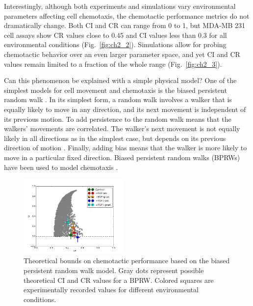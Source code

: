 Interestingly, although both experiments  and simulations vary environmental parameters affecting cell chemotaxis, the chemotactic performance metrics do not dramatically change. Both CI and CR can range from 0 to 1, but MDA-MB 231 cell assays show CR values close to 0.45 and CI values less than 0.3 for all environmental conditions (Fig.\ \ref{fig:ch2_2}). Simulations allow for probing chemotactic behavior over an even larger parameter space, and yet CI and CR values remain limited to a fraction of the whole range (Fig.\ \ref{fig:ch2_3}).

Can this phenomenon be explained with a simple physical model? One of the simplest models for cell movement and chemotaxis is the biased persistent random walk \cite{alt1980biased,othmer1988models}. In its simplest form, a random walk involves a walker that is equally likely to move in any direction, and its next movement is independent of its previous motion. To add persistence to the random walk means that the walkers' movements are correlated. The walker's next movement is not equally likely in all directions as in the simplest case, but depends on its previous direction of motion \cite{patlak1953random}. Finally, adding bias means that the walker is more likely to move in a particular fixed direction.
Biased persistent random walks (BPRWs) have been used to model chemotaxis \cite{alt1980biased,othmer1988models}.

\begin{figure}
    \centering
    \includegraphics[width=0.48\textwidth]{../fig/ch2_fig4.png}
    \caption{Theoretical bounds on chemotactic performance based on the biased persistent random walk model. Gray dots represent possible theoretical CI and CR values for a BPRW. Colored squares are experimentally recorded values for different environmental conditions.} \label{fig:ch2_4}
\end{figure}

